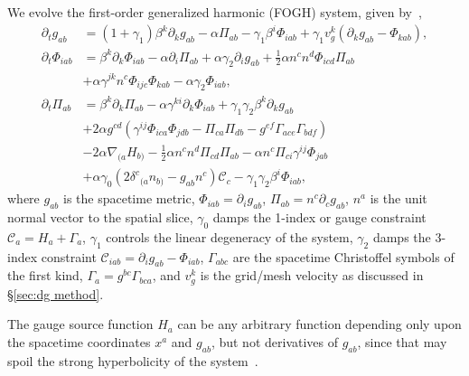 \begin{bibunit}[unsrtnat]
We evolve the first-order generalized harmonic (FOGH) system, given
by~\cite{Lindblom:2005qh},
\begin{eqnarray}
  \label{eq:fosh gh metric evolution}
  \partial_t g_{ab}
  &=\left(1+\gamma_1\right)\beta^k\partial_k g_{ab}
    -\alpha \Pi_{ab}-\gamma_1\beta^i\Phi_{iab}
    +\gamma_1v^k_g\left(\partial_k g_{ab}-\Phi_{kab}\right), \\
  \label{eq:fosh gh metric derivative evolution}
  \partial_t\Phi_{iab}
  &=\beta^k\partial_k\Phi_{iab} - \alpha \partial_i\Pi_{ab}
    + \alpha \gamma_2\partial_ig_{ab}
    +\frac{1}{2}\alpha n^c n^d\Phi_{icd}\Pi_{ab} \nonumber \\
  &+ \alpha \gamma^{jk}n^c\Phi_{ijc}\Phi_{kab}
    -\alpha \gamma_2\Phi_{iab},\\
  \label{eq:fosh gh metric conjugate evolution}
  \partial_t\Pi_{ab}
  &=\beta^k\partial_k\Pi_{ab} - \alpha \gamma^{ki}\partial_k\Phi_{iab}
    + \gamma_1\gamma_2\beta^k\partial_kg_{ab} \nonumber \\
  &+2\alpha g^{cd}\left(\gamma^{ij}\Phi_{ica}\Phi_{jdb}
    - \Pi_{ca}\Pi_{db} - g^{ef}\Gamma_{ace}\Gamma_{bdf}\right) \nonumber \\
  &-2\alpha \nabla_{(a}H_{b)}
    - \frac{1}{2}\alpha n^c n^d\Pi_{cd}\Pi_{ab}
    - \alpha n^c \Pi_{ci}\gamma^{ij}\Phi_{jab} \nonumber \\
  &+\alpha \gamma_0\left(2\delta^c{}_{(a} n_{b)}
    - g_{ab}n^c\right)\mathcal{C}_c -\gamma_1\gamma_2 \beta^i\Phi_{iab},
\end{eqnarray}
where $g_{ab}$ is the spacetime metric, $\Phi_{iab}=\partial_i g_{ab}$,
$\Pi_{ab} = n^c\partial_cg_{ab}$, $n^a$ is the unit normal vector to the spatial
slice, $\gamma_0$ damps the 1-index or gauge constraint
$\mathcal{C}_a=H_a+\Gamma_a$, $\gamma_1$ controls the linear degeneracy of the
system, $\gamma_2$ damps the 3-index constraint
$\mathcal{C}_{iab}=\partial_i g_{ab}-\Phi_{iab}$, $\Gamma_{abc}$ are the
spacetime Christoffel symbols of the first kind, $\Gamma_a=g^{bc}\Gamma_{bca}$,
and $v^k_g$ is the grid/mesh velocity as discussed in \S\ref{sec:dg method}.

The gauge source function $H_a$ can be any arbitrary function depending only
upon the spacetime coordinates $x^a$ and $g_{ab}$, but not derivatives of
$g_{ab}$, since that may spoil the strong hyperbolicity of the
system~\cite{Lindblom:2007xw, Szilagyi:2009qz}.


\end{bibunit}
